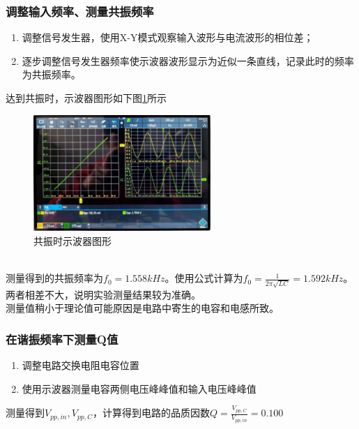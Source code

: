 \documentclass[UTF8]{ctexart}
\begin{document}
\subsubsection{调整输入频率、测量共振频率}
\begin{enumerate}
    \item 调整信号发生器，使用X-Y模式观察输入波形与电流波形的相位差；
    \item 逐步调整信号发生器频率使示波器波形显示为近似一条直线，记录此时的频率为共振频率。
\end{enumerate}
达到共振时，示波器图形如下图\ref{fig:resonance}所示
\begin{figure}[htbp]
\centering
\includegraphics[width=0.6\textwidth]{resonance.jpg}
\caption{共振时示波器图形}\label{fig:resonance}
\end{figure}
\\测量得到的共振频率为$f_0=1.558kHz$。使用公式计算为$f_0=\frac{1}{2\pi\sqrt{LC}}=1.592kHz$。两者相差不大，说明实验测量结果较为准确。
\\测量值稍小于理论值可能原因是电路中寄生的电容和电感所致。
\subsubsection{在谐振频率下测量Q值}
\begin{enumerate}
    \item 调整电路交换电阻电容位置
    \item 使用示波器测量电容两侧电压峰峰值和输入电压峰峰值
\end{enumerate}
测量得到$V_{pp,in},V_{pp,C}$，计算得到电路的品质因数$Q=\frac{V_{pp,C}}{V_{pp,in}}=0.100$
\end{document}
